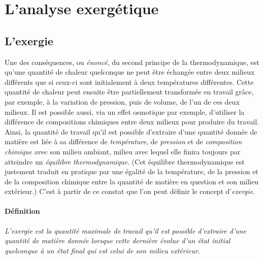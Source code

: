 \documentclass[a4paper,11pt]{scrartcl}
\begin{document}

\section{L'analyse exergétique}

\subsection{L'exergie} Une des conséquences, ou \emph{énoncé}, du second
principe de la thermodynamique, est qu'une quantité de chaleur quelconque ne
peut être échangée entre deux milieux différents que si ceux-ci sont
initialement à deux températures différentes. Cette quantité de chaleur peut
ensuite être partiellement transformée en travail grâce, par exemple, à la
variation de pression, puis de volume, de l'un de ces deux milieux. Il est
possible aussi, via un effet osmotique par exemple, d'utiliser la différence de
compositions chimiques entre deux milieux pour produire du travail. Ainsi, la
quantité de travail qu'il est possible d'extraire d'une quantité donnée de
matière est liée à sa différence de \emph{température}, de \emph{pression} et de
\emph{composition chimique} avec son milieu ambiant, milieu avec lequel elle
finira toujours par atteindre un \emph{équilibre thermodynamique}. (Cet
équilibre thermodynamique est justement traduit en pratique par une égalité de
la température, de la pression et de la composition chimique entre la quantité
de matière en question et son milieu extérieur.) C'est à partir de ce constat
que l'on peut définir le concept d'\emph{exergie}.

\paragraph{Définition} \textsl{L'exergie est la quantité maximale de travail
qu'il est possible d'extraire d'une quantité de matière donnée lorsque cette
dernière évolue d'un état initial quelconque à un état final qui est celui de
son milieu extérieur.}
\end{document}
